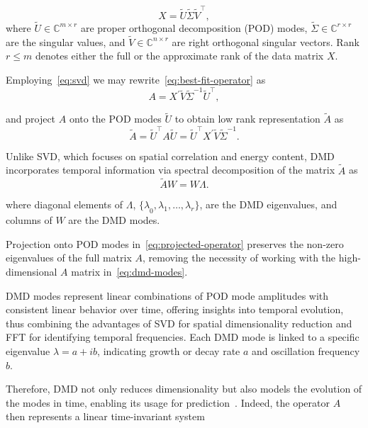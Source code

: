\begin{equation}\label{eq:svd}
    X = \tilde{U} \tilde{\Sigma} \tilde{V}^\top,
\end{equation}
where \(\tilde{U} \in \mathbb{C}^{m \times r}\) are proper orthogonal decomposition (POD) modes, \(\tilde{\Sigma} \in \mathbb{C}^{r \times r}\) are the singular values, and \( \tilde{V} \in \mathbb{C}^{n \times r}\) are right orthogonal singular vectors. Rank \(r \leq m\) denotes either the full or the approximate rank of the data matrix \(X\).

Employing~\eqref{eq:svd} we may rewrite~\eqref{eq:best-fit-operator} as
\begin{equation*}
    A = X^\prime \tilde{V} \tilde{\Sigma}^{-1} \tilde{U}^\top,
\end{equation*}

and project \(A\) onto the POD modes \(\tilde{U}\) to obtain low rank representation \(\tilde{A}\) as
\begin{equation}\label{eq:projected-operator}
    \tilde{A} = \tilde{U}^\top A \tilde{U} = \tilde{U}^\top X^\prime \tilde{V} \tilde{\Sigma}^{-1}.
\end{equation}

Unlike SVD, which focuses on spatial correlation and energy content, DMD incorporates temporal information via spectral decomposition of the matrix \(\tilde{A}\) as
\begin{equation}\label{eq:dmd-modes}
    \tilde{A} W = W \Lambda.
\end{equation}

where diagonal elements of \(\Lambda \), \({\{\lambda}_0, {\lambda}_1, \ldots, {\lambda}_r\} \), are the DMD eigenvalues, and columns of \(W\) are the DMD modes.

Projection onto POD modes in~\eqref{eq:projected-operator} preserves the non-zero eigenvalues of the full matrix \(A\), removing the necessity of working with the high-dimensional \(A\) matrix in~\eqref{eq:dmd-modes}.

DMD modes represent linear combinations of POD mode amplitudes with consistent linear behavior over time, offering insights into temporal evolution, thus combining the advantages of SVD for spatial dimensionality reduction and FFT for identifying temporal frequencies. Each DMD mode is linked to a specific eigenvalue \(\lambda = a + ib\), indicating growth or decay rate \(a\) and oscillation frequency \(b\).

Therefore, DMD not only reduces dimensionality but also models the evolution of the modes in time, enabling its usage for prediction~\cite{Brunton2022}. Indeed, the operator \(A\) then represents a linear time-invariant system

